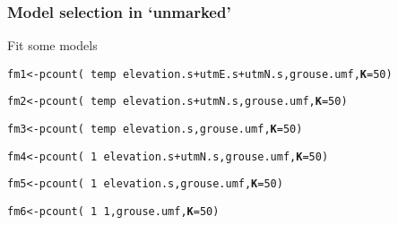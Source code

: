 \documentclass[color=usenames,dvipsnames]{beamer}\usepackage[]{graphicx}\usepackage[]{color}
\makeatletter
\newcommand{\hlnum}[1]{\textcolor[rgb]{0.69,0.494,0}{#1}}%
\newcommand{\hlopt}[1]{\textcolor[rgb]{0,0,0}{#1}}%
\newcommand{\hlstd}[1]{\textcolor[rgb]{0,0,0}{#1}}%
\newcommand{\hlkwb}[1]{\textcolor[rgb]{0,0.341,0.682}{#1}}%
\newcommand{\hlkwc}[1]{\textcolor[rgb]{0,0,0}{\textbf{#1}}}%
\newcommand{\hlkwd}[1]{\textcolor[rgb]{0.004,0.004,0.506}{#1}}%
\newenvironment{kframe}{%
 \def\at@end@of@kframe{}%
 \ifinner\ifhmode%
  \def\at@end@of@kframe{\end{minipage}}%
  \begin{minipage}{\columnwidth}%
 \fi\fi%
 \def\FrameCommand##1{\hskip\@totalleftmargin \hskip-\fboxsep
 \colorbox{shadecolor}{##1}\hskip-\fboxsep
     \hskip-\linewidth \hskip-\@totalleftmargin \hskip\columnwidth}%
 \MakeFramed {\advance\hsize-\width
   \@totalleftmargin\z@ \linewidth\hsize
   \@setminipage}}%
 {\par\unskip\endMakeFramed%
 \at@end@of@kframe}
\newenvironment{knitrout}{}{} %
\makeatother
\begin{document}
\begin{frame}[fragile]
  \frametitle{Model selection in `unmarked'}
  \small
  Fit some models
  \vspace{-6pt}
\begin{knitrout}\footnotesize
{}\color{fgcolor}\begin{kframe}
\begin{alltt}
\hlstd{fm1} \hlkwb{<-} \hlkwd{pcount}\hlstd{(}\hlopt{~}\hlstd{temp} \hlopt{~} \hlstd{elevation.s}\hlopt{+}\hlstd{utmE.s}\hlopt{+}\hlstd{utmN.s, grouse.umf,} \hlkwc{K}\hlstd{=}\hlnum{50}\hlstd{)}
\end{alltt}


{\ttfamily\noindent\bfseries{}}\begin{alltt}
\hlstd{fm2} \hlkwb{<-} \hlkwd{pcount}\hlstd{(}\hlopt{~}\hlstd{temp} \hlopt{~} \hlstd{elevation.s}\hlopt{+}\hlstd{utmN.s, grouse.umf,} \hlkwc{K}\hlstd{=}\hlnum{50}\hlstd{)}
\end{alltt}


{\ttfamily\noindent\bfseries{}}\begin{alltt}
\hlstd{fm3} \hlkwb{<-} \hlkwd{pcount}\hlstd{(}\hlopt{~}\hlstd{temp} \hlopt{~} \hlstd{elevation.s, grouse.umf,} \hlkwc{K}\hlstd{=}\hlnum{50}\hlstd{)}
\end{alltt}


{\ttfamily\noindent\bfseries{}}\begin{alltt}
\hlstd{fm4} \hlkwb{<-} \hlkwd{pcount}\hlstd{(}\hlopt{~}\hlnum{1} \hlopt{~} \hlstd{elevation.s}\hlopt{+}\hlstd{utmN.s, grouse.umf,} \hlkwc{K}\hlstd{=}\hlnum{50}\hlstd{)}
\end{alltt}


{\ttfamily\noindent\bfseries{}}\begin{alltt}
\hlstd{fm5} \hlkwb{<-} \hlkwd{pcount}\hlstd{(}\hlopt{~}\hlnum{1} \hlopt{~} \hlstd{elevation.s, grouse.umf,} \hlkwc{K}\hlstd{=}\hlnum{50}\hlstd{)}
\end{alltt}


{\ttfamily\noindent\bfseries{}}\begin{alltt}
\hlstd{fm6} \hlkwb{<-} \hlkwd{pcount}\hlstd{(}\hlopt{~}\hlnum{1} \hlopt{~} \hlnum{1}\hlstd{, grouse.umf,} \hlkwc{K}\hlstd{=}\hlnum{50}\hlstd{)}
\end{alltt}



\end{kframe}
\end{knitrout}
\end{frame}
\end{document}
